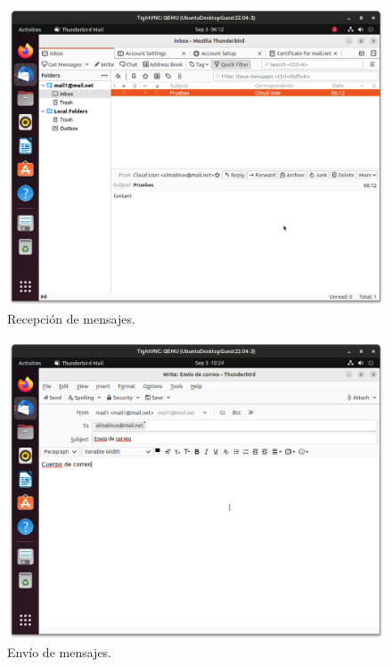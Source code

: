 \begin{figure}[H]
	\centering
	\includegraphics[scale=0.30]{17}
	\caption{Recepción de mensajes.}
\end{figure}

\begin{figure}[H]
	\centering
	\includegraphics[scale=0.30]{18}
	\caption{Envío de mensajes.}
\end{figure}

